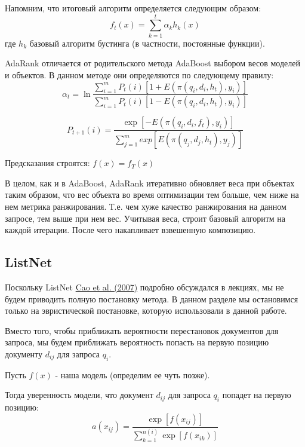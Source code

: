 \documentclass{article}[16pt]
\newcommand{\bibref}[3]{\hyperlink{#1}{#2 (#3)}}
\begin{document}
	Напомним, что итоговый алгоритм определяется следующим образом:
	\begin{equation}
		f_t(x) = \sum_{k=1}^t \alpha_k h_k(x)
	\end{equation}
	где $h_k$ базовый алгоритм бустинга (в частности, постоянные функции).
	
	AdaRank отличается от родительского метода AdaBoost выбором весов моделей и объектов. В данном методе они определяются по следующему правилу:
	\begin{equation}
		\alpha_t = \ln \frac{\sum_{i=1}^m P_t(i) [1 + E(\pi (q_i, d_i, h_t), y_i)]}{\sum_{i=1}^m P_t(i) [1 - E(\pi (q_i, d_i, h_t), y_i)]}
	\end{equation}
	
	\begin{equation}
		P_{t+1}(i) = \frac{\exp[-E(\pi (q_i, d_i, f_t), y_i)]}{\sum_{j=1}^m exp[E(\pi (q_j, d_j, h_t), y_j)]}
	\end{equation}
	
	Предсказания строятся: $f(x) = f_T(x)$
	
	В целом, как и в AdaBoost, AdaRank итеративно обновляет веса при объектах таким образом, что вес объекта во время оптимизации тем больше, чем ниже на нем метрика ранжирования. Т.е. чем хуже качество ранжирования на данном запросе, тем выше при нем вес. Учитывая веса, строит базовый алгоритм на каждой итерации. После чего накапливает взвешенную композицию.
	
	\subsection{ListNet}
	Поскольку ListNet \bibref{listnet}{Cao et al.}{2007} подробно обсуждался в лекциях, мы не будем приводить полную постановку метода. В данном разделе мы остановимся только на эвристической постановке, которую использовали в данной работе.
	
	Вместо того, чтобы приближать вероятности перестановок документов для запроса, мы будем приближать вероятность попасть на первую позицию документу $d_{ij}$ для запроса $q_i$. 
	
	Пусть $f(x)$ - наша модель (определим ее чуть позже). 
	
	Тогда уверенность модели, что документ $d_{ij}$ для запроса $q_i$ попадет на первую позицию:
	\begin{equation}
		a(x_{ij}) = \frac{\exp[f(x_{ij})]}{\sum_{k=1}^{n(i)}\exp[f(x_{ik})]}
	\end{equation}
	
\end{document}
